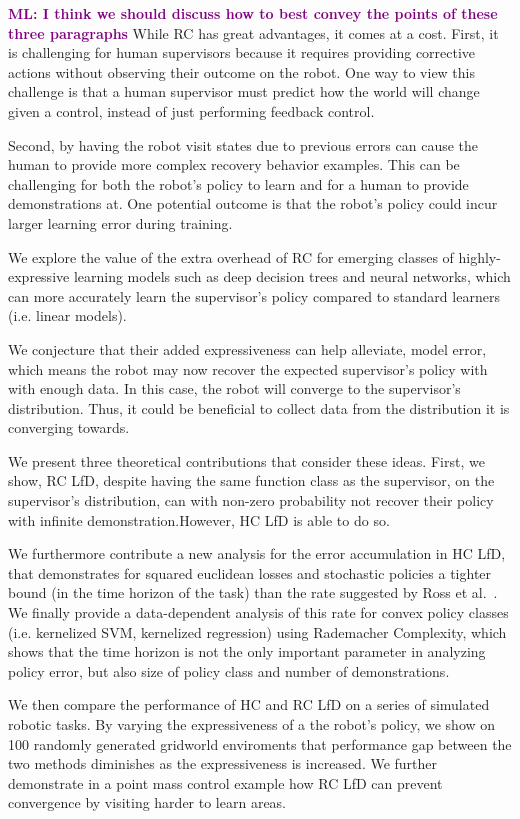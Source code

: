 \documentclass[10pt, conference]{ieeeconf}      %
\newcommand{\mlnote}[1]{\ifthenelse{ \boolean{include-notes}}%
 {\textcolor{purple}{\textbf{ML: #1}}}{}}
\begin{document}
\mlnote{I think we should discuss how to best convey the points of these three paragraphs}
While RC has great advantages, it comes at a cost. First, it is challenging for human supervisors because it requires providing corrective actions without observing their outcome on the robot. One way to view this challenge is that a human supervisor must  predict how the world will change given a control, instead of just performing feedback control. 

 Second, by having the robot visit states due to previous errors can cause the human to provide more complex recovery behavior examples. This can be challenging for both the robot's policy to learn and for a human to provide demonstrations at. One potential outcome is that the robot's policy could incur larger learning error during training. 

We explore the value of the extra overhead of RC for emerging classes of highly-expressive learning models such as deep decision trees and neural networks, which can more accurately learn the supervisor's policy compared to standard learners (i.e. linear models). 

We  conjecture that their added expressiveness can help alleviate, model error, which means the robot may now recover the expected supervisor's policy with with enough data. In this case, the robot will converge to the  supervisor's distribution. Thus,  it could be beneficial to collect data from the distribution it is converging towards. 

We present three theoretical contributions that consider these ideas. First, we show, RC LfD, despite having the same function class as the supervisor, on the supervisor's distribution, can with non-zero probability not recover their policy with infinite demonstration.However, HC LfD is able to do so. 


We furthermore contribute a new analysis for the error accumulation in HC LfD, that demonstrates for squared euclidean losses and stochastic policies a tighter bound (in the time horizon of the task) than the rate suggested by Ross et al.~\cite{ross2010efficient}. We finally provide a data-dependent analysis of this rate for convex policy classes (i.e. kernelized SVM, kernelized regression) using Rademacher Complexity, which shows that the time horizon is not the only important parameter in analyzing policy error, but also size of policy class and number of demonstrations.


We then compare the performance of HC and RC LfD on a series of simulated robotic tasks. By varying the expressiveness of a the robot's policy, we show on 100 randomly generated gridworld enviroments that performance gap between the two methods diminishes as the expressiveness is increased. We further demonstrate in a point mass control example how RC LfD can prevent convergence by visiting harder to learn areas. 
\end{document}
